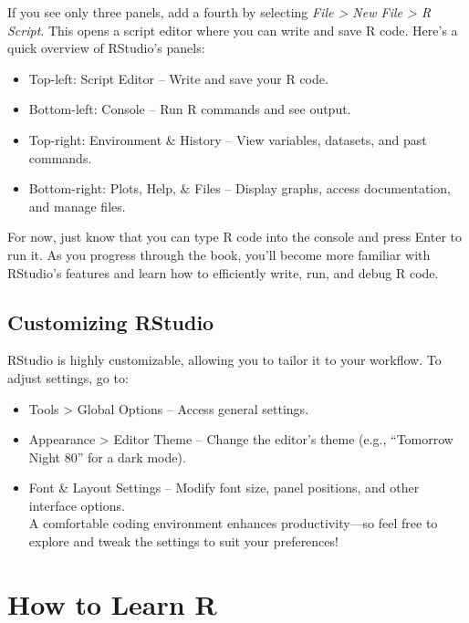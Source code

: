 \documentclass[
  11pt,
]{book}
\providecommand{\tightlist}{%
  \setlength{\itemsep}{0pt}\setlength{\parskip}{0pt}}
\theoremstyle{definition}
\theoremstyle{definition}
\theoremstyle{definition}
\theoremstyle{definition}
\theoremstyle{remark}
\begin{document}
If you see only three panels, add a fourth by selecting \emph{File \textgreater{} New File \textgreater{} R Script}. This opens a script editor where you can write and save R code. Here's a quick overview of RStudio's panels:

\begin{itemize}
\tightlist
\item
  Top-left: Script Editor -- Write and save your R code.\\
\item
  Bottom-left: Console -- Run R commands and see output.\\
\item
  Top-right: Environment \& History -- View variables, datasets, and past commands.\\
\item
  Bottom-right: Plots, Help, \& Files -- Display graphs, access documentation, and manage files.
\end{itemize}

For now, just know that you can type R code into the console and press Enter to run it. As you progress through the book, you'll become more familiar with RStudio's features and learn how to efficiently write, run, and debug R code.

\subsection*{Customizing RStudio}\label{customizing-rstudio}


RStudio is highly customizable, allowing you to tailor it to your workflow. To adjust settings, go to:

\begin{itemize}
\tightlist
\item
  Tools \textgreater{} Global Options -- Access general settings.\\
\item
  Appearance \textgreater{} Editor Theme -- Change the editor's theme (e.g., ``Tomorrow Night 80'' for a dark mode).\\
\item
  Font \& Layout Settings -- Modify font size, panel positions, and other interface options.\\
  A comfortable coding environment enhances productivity---so feel free to explore and tweak the settings to suit your preferences!
\end{itemize}

\section{How to Learn R}\label{how-to-learn-r}
\end{document}
